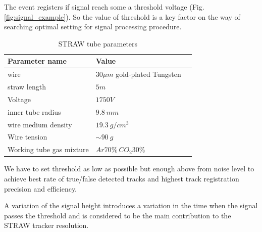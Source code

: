 \documentclass[12pt,a4paper]{article}
\begin{document}
	The event registers if signal reach some a threshold voltage (Fig. \ref{fig:signal_example}). So the value of threshold is a key factor on the way of searching optimal setting for signal processing procedure.
	
	\begin{table}[h]
	\centering
	\caption[Table caption text]{STRAW tube parameters }
	\begin{tabular}{|l|l|p{8cm}|}
		\hline
		Parameter name & Value \\
		\hline
		wire & $30\mu m$ gold-plated Tungsten\\
		\hline
		straw length & $5m$ \\
		\hline
		Voltage & $1750 V$ \\
		\hline
		inner tube radius & $9.8~mm$ \\
		\hline
		wire medium density & $19.3 ~g/cm^3$ \\
		\hline
		Wire tension& $\sim 90~g$ \\
		\hline
		Working tube gas mixture & $Ar70\% ~CO_2 30\%$ \\
		\hline
	\end{tabular}
	
	\label{table:straw_par}
	\end{table}		
	
	We have to set threshold as low as possible but enough above from noise level to achieve best rate of true/false detected tracks and highest track registration precision and efficiency.
	
	A variation of the signal height introduces a variation in the time when the signal passes the threshold and is considered to be the main contribution to the STRAW tracker resolution.
	
\end{document}

